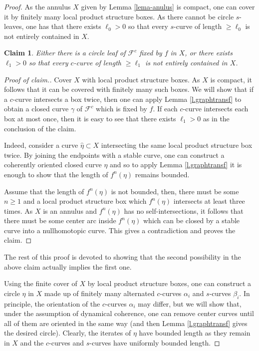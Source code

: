 \documentclass[11pt]{amsart} %
\newcommand{\cF}{\mathcal{F}}
\numberwithin{equation}{section}
\newtheorem*{af}{Claim}
\theoremstyle{remark}
\begin{document}
\begin{proof}
As the annulus $X$ given by Lemma \ref{lema-anulus} is compact, one can cover it by finitely many local product structure boxes. As there cannot be circle $s$-leaves, one has that there exists $\ell_0>0$ so that every $s$-curve of length $\geq \ell_0$ is not entirely contained in $X$. 

\begin{af}
Either there is a circle leaf  of $\cF^c$ fixed by $f$ in $X$, or there exists $\ell_1>0$ so that every $c$-curve of length $\geq \ell_1$ is not entirely contained in $X$.
\end{af}

\begin{proof}[Proof of claim.]
Cover $X$ with local product structure boxes. As $X$ is compact, it follows that it can be covered with finitely many such boxes. We will show that if a $c$-curve intersects a box twice, then one can apply Lemma \ref{l.graphtransf} to obtain a closed curve $\gamma$ of $\cF^c$ which is fixed by $f$. If each $c$-curve intersects each box at most once, then it is easy to see that there exists $\ell_1>0$ as in the conclusion of the claim. 

Indeed, consider a curve $\hat \eta \subset X$ intersecting the same local product structure box twice. By joining the endpoints with a stable curve, one can construct a coherently oriented closed curve $\eta$ and so to apply Lemma \ref{l.graphtransf} it is enough to show that the length of $f^n(\eta)$ remains bounded.

Assume that the length of $f^n(\eta)$ is not bounded, then, there must be some $n\geq 1$ and a local product structure box which $f^n(\eta)$ intersects at least three times. As $X$ is an annulus and $f^n(\eta)$ has no self-intersections, it follows that there must be some center arc inside $f^n(\eta)$ which can be closed by a stable curve into a nullhomotopic curve. This gives a contradiction
and proves the claim.
%
\end{proof}

The rest of this proof is devoted to showing that the second possibility
in the above claim actually implies the first one.  

    Using the finite cover of $X$ by local product structure boxes, one can construct a circle $\eta$ in $X$ made up of finitely many alternated $c$-curves $\alpha_i$ and $s$-curves $\beta_i$.  In principle, the orientation of the $c$-curves $\alpha_i$ may differ, but we will show that, under the assumption of dynamical coherence, one can remove center curves until all of them are oriented in the same way (and then Lemma \ref{l.graphtransf} gives the desired circle). Clearly, the iterates of $\eta$ have bounded length as they remain in $X$ and the $c$-curves and $s$-curves have uniformly bounded length. 


\end{proof}
\end{document}
